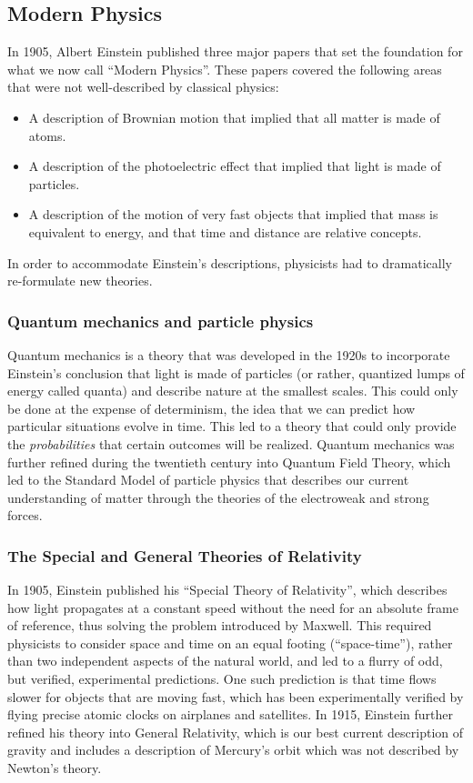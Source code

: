 \documentclass[9pt,Preprint]{lapreprint}
\begin{document}
\subsection{Modern Physics}

In 1905, Albert Einstein published three major papers that set the foundation for what we now call ``Modern Physics''. These papers covered the following areas that were not well-described by classical physics:

\begin{itemize}
\item A description of Brownian motion that implied that all matter is made of atoms.
\item A description of the photoelectric effect that implied that light is made of particles.
\item A description of the motion of very fast objects that implied that mass is equivalent to energy, and that time and distance are relative concepts.
\end{itemize}

In order to accommodate Einstein's descriptions, physicists had to dramatically re-formulate new theories.

\subsubsection{Quantum mechanics and particle physics}

Quantum mechanics is a theory that was developed in the 1920s to incorporate Einstein's conclusion that light is made of particles (or rather, quantized lumps of energy called quanta) and describe nature at the smallest scales. This could only be done at the expense of determinism, the idea that we can predict how particular situations evolve in time. This led to a theory that could only provide the \textit{probabilities} that certain outcomes will be realized. Quantum mechanics was further refined during the twentieth century into Quantum Field Theory, which led to the Standard Model of particle physics that describes our current understanding of matter through the theories of the electroweak and strong forces.

\subsubsection{The Special and General Theories of Relativity}

In 1905, Einstein published his ``Special Theory of Relativity'', which describes how light propagates at a constant speed without the need for an absolute frame of reference, thus solving the problem introduced by Maxwell. This required physicists to consider space and time on an equal footing (``space-time''), rather than two independent aspects of the natural world, and led to a flurry of odd, but verified, experimental predictions. One such prediction is that time flows slower for objects that are moving fast, which has been experimentally verified by flying precise atomic clocks on airplanes and satellites. In 1915, Einstein further refined his theory into General Relativity, which is our best current description of gravity and includes a description of Mercury's orbit which was not described by Newton's theory.
\end{document}
